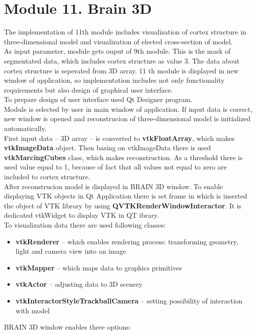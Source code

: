 \section{Module 11. Brain 3D}

\indent The implementation of 11th module includes visualization of cortex structure in three-dimensional model and visualization of elected cross-section of model. \\
\indent  As input parameter, module gets ouput of 9th module. This is the mask of segmentated data, which includes cortex structure as value 3. The data about cortex structure is seperated from 3D array.
11 th module is displayed in new window of application, so implementation includes not only functionality requirements but also design of graphical user interface.  \\
\indent To prepare design of user interface used Qt Designer program. \\
\indent Module is selected by user in main window of application. If input data is correct, new window is opened and reconstrucion of three-dimensional model is initialized automatically. \\
\indent First input data – 3D array – is converted to \textbf{vtkFloatArray}, which makes \textbf{vtkImageData} object. Then basing on vtkImageData there is used \textbf{vtkMarcingCubes} class, which makes reconstruction. As a threshold there is used value equal to 1, because of fact that all values not equal to zero are included to cortex structure. \\
\indent After reconstrucion model is displayed in BRAIN 3D window. To enable displaying VTK objects in Qt Application there is set frame in which is inserted the object of VTK library by using \textbf{QVTKRenderWindowInteractor}. It is dedicated vtkWidget to display VTK in QT ibrary.\\
\indent To visualization data there are used following classes:
\begin{itemize}
\item \textbf{vtkRenderer} – which enables rendering process: transforming geometry, light and camera view into an image
\item \textbf{vtkMapper} – which maps data to graphics primitives
\item \textbf{vtkActor} – adjusting data to 3D scenery
\item \textbf{vtkInteractorStyleTrackballCamera} – setting possibility of interaction with model
\end{itemize}
\indent BRAIN 3D window enables three options:
